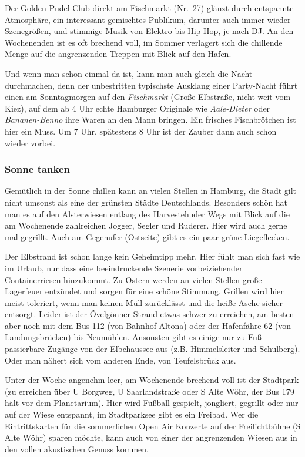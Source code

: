 Der Golden Pudel Club direkt am Fischmarkt (Nr.~27) glänzt durch entspannte
Atmosphäre, ein interessant gemischtes Publikum, darunter auch immer wieder
Szenegrößen, und stimmige Musik von Elektro bis Hip-Hop, je nach DJ. An den
Wochenenden ist es oft brechend voll, im Sommer verlagert sich die chillende
Menge auf die angrenzenden Treppen mit Blick auf den Hafen.

Und wenn man schon einmal da ist, kann man auch gleich die Nacht durchmachen,
denn der unbestritten typischste Ausklang einer Party-Nacht führt einen am
Sonntagmorgen auf den \emph{Fischmarkt} (Große Elbstraße, nicht weit vom Kiez),
auf dem ab 4 Uhr echte Hamburger Originale wie \emph{Aale-Dieter} oder
\emph{Bananen-Benno} ihre Waren an den Mann bringen. Ein frisches Fischbrötchen
ist hier ein Muss. Um 7 Uhr, spätestens 8 Uhr ist der Zauber dann auch schon
wieder vorbei.

\subsubsection{Sonne tanken}

Gemütlich in der Sonne chillen kann an vielen Stellen in Hamburg, die Stadt
gilt nicht umsonst als eine der grünsten Städte Deutschlands. Besonders schön
hat man es auf den Alsterwiesen entlang des Harvestehuder Wegs mit Blick auf
die am Wochenende zahlreichen Jogger, Segler und Ruderer. Hier wird auch gerne
mal gegrillt. Auch am Gegenufer (Ostseite) gibt es ein paar grüne
Liegeflecken.

Der Elbstrand ist schon lange kein Geheimtipp mehr. Hier fühlt man sich fast
wie im Urlaub, nur dass eine beeindruckende Szenerie vorbeiziehender
Containerriesen hinzukommt. Zu Ostern werden an vielen Stellen große Lagerfeuer
entzündet und sorgen für eine schöne Stimmung. Grillen wird hier meist
toleriert, wenn man keinen Müll zurücklässt und die heiße Asche sicher
entsorgt. Leider ist der Övelgönner Strand etwas schwer zu erreichen, am besten
aber noch mit dem Bus 112 (von Bahnhof Altona) oder der Hafenfähre 62 (von
Landungsbrücken) bis Neumühlen. Ansonsten gibt es einige nur zu Fuß passierbare
Zugänge von der Elbchaussee aus (z.B. Himmelsleiter und Schulberg). Oder man
nähert sich vom anderen Ende, von Teufelsbrück aus.

Unter der Woche angenehm leer, am Wochenende brechend voll ist der Stadtpark
(zu erreichen über U Borgweg, U Saarlandstraße oder S Alte Wöhr, der Bus 179
hält vor dem Planetarium). Hier wird Fußball gespielt, jongliert, gegrillt oder
nur auf der Wiese entspannt, im Stadtparksee gibt es ein Freibad. Wer die
Eintrittskarten für die sommerlichen Open Air Konzerte auf der Freilichtbühne
(S Alte Wöhr) sparen möchte, kann auch von einer der angrenzenden Wiesen aus in
den vollen akustischen Genuss kommen.

